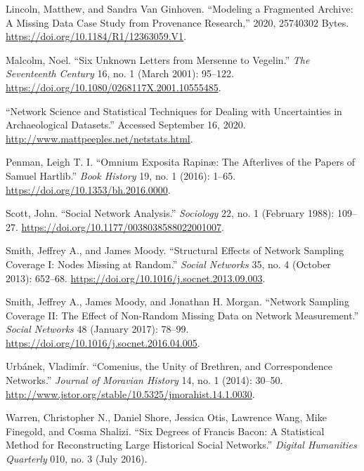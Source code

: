 \documentclass[]{article}
\begin{document}
\leavevmode\hypertarget{ref-lincoln_modeling_2020}{}%
Lincoln, Matthew, and Sandra Van Ginhoven. ``Modeling a Fragmented Archive: A Missing Data Case Study from Provenance Research,'' 2020, 25740302 Bytes. \url{https://doi.org/10.1184/R1/12363059.V1}.

\leavevmode\hypertarget{ref-malcolm_six_2001}{}%
Malcolm, Noel. ``Six Unknown Letters from Mersenne to Vegelin.'' \emph{The Seventeenth Century} 16, no. 1 (March 2001): 95--122. \url{https://doi.org/10.1080/0268117X.2001.10555485}.

\leavevmode\hypertarget{ref-noauthor_network_nodate}{}%
``Network Science and Statistical Techniques for Dealing with Uncertainties in Archaeological Datasets.'' Accessed September 16, 2020. \url{http://www.mattpeeples.net/netstats.html}.

\leavevmode\hypertarget{ref-penman_omnium_2016}{}%
Penman, Leigh T. I. ``Omnium Exposita Rapinæ: The Afterlives of the Papers of Samuel Hartlib.'' \emph{Book History} 19, no. 1 (2016): 1--65. \url{https://doi.org/10.1353/bh.2016.0000}.

\leavevmode\hypertarget{ref-scott_social_1988}{}%
Scott, John. ``Social Network Analysis.'' \emph{Sociology} 22, no. 1 (February 1988): 109--27. \url{https://doi.org/10.1177/0038038588022001007}.

\leavevmode\hypertarget{ref-smith_structural_2013}{}%
Smith, Jeffrey A., and James Moody. ``Structural Effects of Network Sampling Coverage I: Nodes Missing at Random.'' \emph{Social Networks} 35, no. 4 (October 2013): 652--68. \url{https://doi.org/10.1016/j.socnet.2013.09.003}.

\leavevmode\hypertarget{ref-smith_network_2017}{}%
Smith, Jeffrey A., James Moody, and Jonathan H. Morgan. ``Network Sampling Coverage II: The Effect of Non-Random Missing Data on Network Measurement.'' \emph{Social Networks} 48 (January 2017): 78--99. \url{https://doi.org/10.1016/j.socnet.2016.04.005}.

\leavevmode\hypertarget{ref-urbanek_comenius_2014}{}%
Urbánek, Vladimír. ``Comenius, the Unity of Brethren, and Correspondence Networks.'' \emph{Journal of Moravian History} 14, no. 1 (2014): 30--50. \url{http://www.jstor.org/stable/10.5325/jmorahist.14.1.0030}.

\leavevmode\hypertarget{ref-warren_six_2016}{}%
Warren, Christopher N., Daniel Shore, Jessica Otis, Lawrence Wang, Mike Finegold, and Cosma Shalizi. ``Six Degrees of Francis Bacon: A Statistical Method for Reconstructing Large Historical Social Networks.'' \emph{Digital Humanities Quarterly} 010, no. 3 (July 2016).
\end{document}
